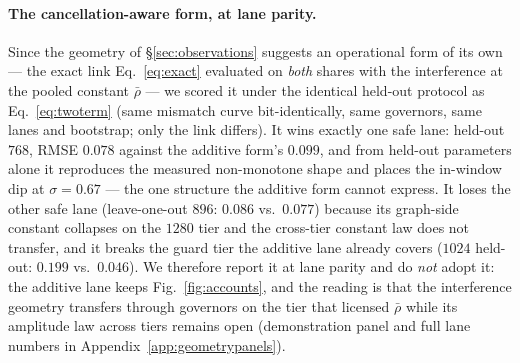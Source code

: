 \paragraph{The cancellation-aware form, at lane parity.}
Since the geometry of \S\ref{sec:observations} suggests an
operational form of its own --- the exact link Eq.~\ref{eq:exact}
evaluated on \emph{both} shares with the interference at the pooled
constant $\bar\rho$ --- we scored it under the identical held-out
protocol as Eq.~\ref{eq:twoterm} (same mismatch curve
bit-identically, same governors, same lanes and bootstrap; only the
link differs). It wins exactly one safe lane: held-out $768$, RMSE
$0.078$ against the additive form's $0.099$, and from held-out
parameters alone it reproduces the measured non-monotone shape and
places the in-window dip at $\sigma = 0.67$ --- the one structure the
additive form cannot express. It loses the other safe lane
(leave-one-out $896$: $0.086$ vs.\ $0.077$) because its graph-side
constant collapses on the $1280$ tier and the cross-tier constant law
does not transfer, and it breaks the guard tier the additive lane
already covers ($1024$ held-out: $0.199$ vs.\ $0.046$). We therefore
report it at lane parity and do \emph{not} adopt it: the additive
lane keeps Fig.~\ref{fig:accounts}, and the reading is that the
interference geometry transfers through governors on the tier that
licensed $\bar\rho$ while its amplitude law across tiers remains
open (demonstration panel and full lane numbers in
Appendix~\ref{app:geometrypanels}).


